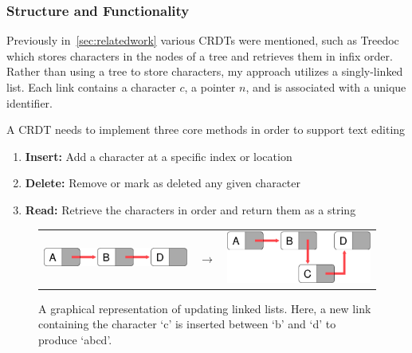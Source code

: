 \documentclass[12pt,a4paper,twoside,openright]{report}
\begin{document}
		\subsubsection{Structure and Functionality} \label{sec:crdtstructure}
		Previously in~\cref{sec:relatedwork} various CRDTs were mentioned, such as Treedoc which stores characters in the nodes of a tree and retrieves them in infix order. Rather than using a tree to store characters, my approach utilizes a singly-linked list. Each link contains a character $c$, a pointer $n$, and is associated with a unique identifier.
		
		A CRDT needs to implement three core methods in order to support text editing
		\begin{enumerate}
			\item \textbf{Insert:} Add a character at a specific index or location
			\item \textbf{Delete:} Remove or mark as deleted any given character
			\item \textbf{Read:} Retrieve the characters in order and return them as a string
		\end{enumerate} 
		
		
		\begin{figure}[htb]
		\centering
		  \begin{tabular}{ >{\centering}m{6cm} >{\centering}m{15mm} >{\centering\arraybackslash}m{6cm} }
		    \includegraphics[width=1\linewidth]{figs/linkedlist_0.eps}  &
		    $\longrightarrow$  &
		    \includegraphics[width=1\linewidth]{figs/linkedlist.eps}
		  \end{tabular}
		\caption[Updating linked lists]{A graphical representation of updating linked lists. Here, a new link containing the character `c' is inserted between `b' and `d' to produce `abcd'.}
		\label{fig:linkedlist}
		\end{figure}
		
\end{document}
